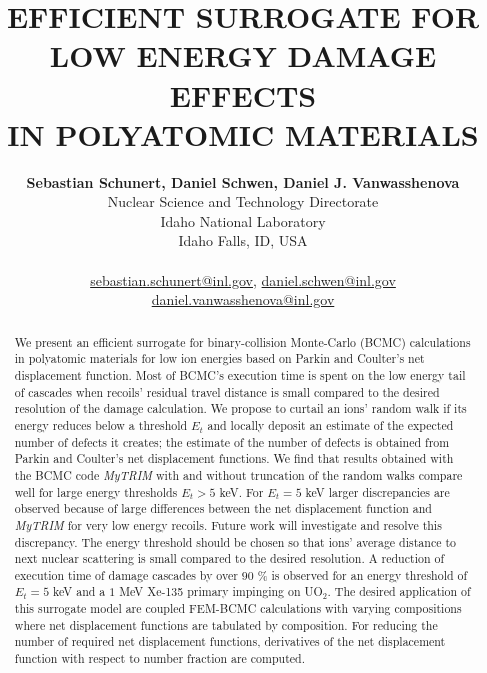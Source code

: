 \documentclass[letterpaper]{mandc2019}
\title{EFFICIENT SURROGATE FOR LOW ENERGY DAMAGE EFFECTS\\ IN POLYATOMIC MATERIALS}
\author{%
  \textbf{Sebastian Schunert, Daniel Schwen, Daniel J. Vanwasshenova} \\
  Nuclear Science and Technology Directorate \\
  Idaho National Laboratory \\ Idaho Falls, ID, USA  \\
     \\
     \url{sebastian.schunert@inl.gov}, \url{daniel.schwen@inl.gov} \\ \url{daniel.vanwasshenova@inl.gov} 
}
\begin{document}
\maketitle
\justify 
\allowdisplaybreaks
\begin{abstract}
  We present an efficient surrogate for binary-collision Monte-Carlo (BCMC) calculations in polyatomic materials for low ion energies based on Parkin and Coulter's net displacement function. Most of BCMC's execution time is spent on
  the low energy tail of cascades when recoils' residual travel distance is small
  compared to the desired resolution of the damage calculation. We propose to 
  curtail an ions' random walk if its energy reduces below a threshold $E_t$ and locally deposit an estimate of the expected number of defects it creates; the estimate of the number of defects is obtained from Parkin and Coulter's net displacement functions. We find that results obtained with the BCMC code \textit{MyTRIM} 
  with and without truncation of the random walks compare well for large energy thresholds $E_t > 5$ keV. For $E_t = 5$ keV larger discrepancies are observed because of large differences between the net displacement function and \textit{MyTRIM} for very low energy recoils. Future work will investigate and resolve this discrepancy. The energy threshold should be chosen so that ions' average distance to next nuclear scattering is small compared to the desired resolution. A reduction of execution time of damage cascades by over $90$ \% is observed for an energy threshold of $E_t = 5$ keV and a $1$ MeV Xe-135 primary impinging on UO$_2$.
  The desired application of this surrogate model are coupled FEM-BCMC calculations with varying compositions where net displacement functions are tabulated by composition. For reducing the number of required net displacement functions, derivatives of the net displacement function with respect to number fraction are computed. 
\end{abstract}

\end{document}
